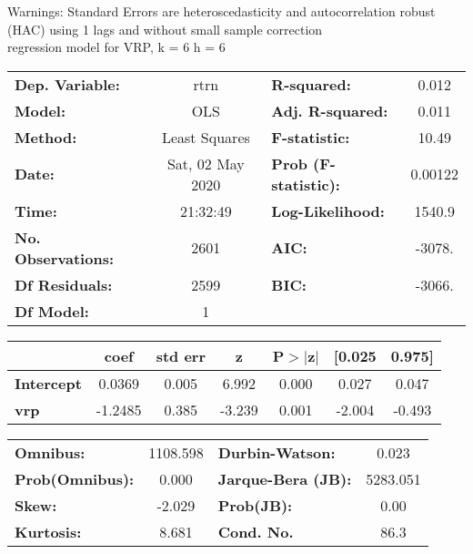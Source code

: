Warnings: \newline
 [1] Standard Errors are heteroscedasticity and autocorrelation robust (HAC) using 1 lags and without small sample correction\\ 

regression model for VRP, k = 6 h = 6\begin{center}
\begin{tabular}{lclc}
\toprule
\textbf{Dep. Variable:}    &       rtrn       & \textbf{  R-squared:         } &     0.012   \\
\textbf{Model:}            &       OLS        & \textbf{  Adj. R-squared:    } &     0.011   \\
\textbf{Method:}           &  Least Squares   & \textbf{  F-statistic:       } &     10.49   \\
\textbf{Date:}             & Sat, 02 May 2020 & \textbf{  Prob (F-statistic):} &  0.00122    \\
\textbf{Time:}             &     21:32:49     & \textbf{  Log-Likelihood:    } &    1540.9   \\
\textbf{No. Observations:} &        2601      & \textbf{  AIC:               } &    -3078.   \\
\textbf{Df Residuals:}     &        2599      & \textbf{  BIC:               } &    -3066.   \\
\textbf{Df Model:}         &           1      & \textbf{                     } &             \\
\bottomrule
\end{tabular}
\begin{tabular}{lcccccc}
                   & \textbf{coef} & \textbf{std err} & \textbf{z} & \textbf{P$> |$z$|$} & \textbf{[0.025} & \textbf{0.975]}  \\
\midrule
\textbf{Intercept} &       0.0369  &        0.005     &     6.992  &         0.000        &        0.027    &        0.047     \\
\textbf{vrp}       &      -1.2485  &        0.385     &    -3.239  &         0.001        &       -2.004    &       -0.493     \\
\bottomrule
\end{tabular}
\begin{tabular}{lclc}
\textbf{Omnibus:}       & 1108.598 & \textbf{  Durbin-Watson:     } &    0.023  \\
\textbf{Prob(Omnibus):} &   0.000  & \textbf{  Jarque-Bera (JB):  } & 5283.051  \\
\textbf{Skew:}          &  -2.029  & \textbf{  Prob(JB):          } &     0.00  \\
\textbf{Kurtosis:}      &   8.681  & \textbf{  Cond. No.          } &     86.3  \\
\bottomrule
\end{tabular}
\end{center}

